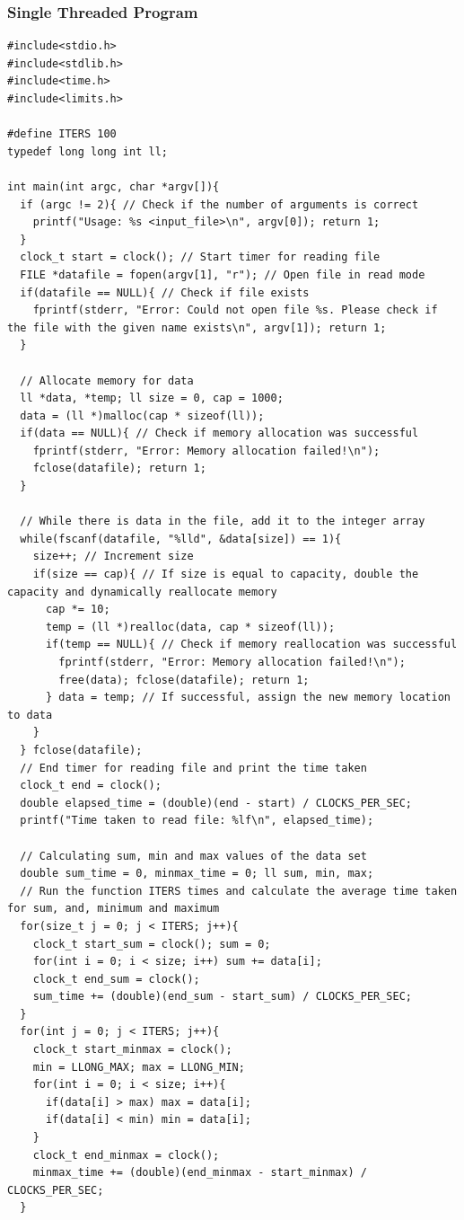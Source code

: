 \documentclass{article}
\theoremstyle{mytheoremstyle}
\theoremstyle{mytheoremstyle}
\theoremstyle{myproblemstyle}
\begin{document}
\subsubsection{Single Threaded Program}
\begin{lstlisting}[caption={Single Threaded Program} label={lst:single}]
#include<stdio.h>
#include<stdlib.h>
#include<time.h>
#include<limits.h>

#define ITERS 100
typedef long long int ll; 

int main(int argc, char *argv[]){
  if (argc != 2){ // Check if the number of arguments is correct
    printf("Usage: %s <input_file>\n", argv[0]); return 1;
  }
  clock_t start = clock(); // Start timer for reading file
  FILE *datafile = fopen(argv[1], "r"); // Open file in read mode
  if(datafile == NULL){ // Check if file exists
    fprintf(stderr, "Error: Could not open file %s. Please check if the file with the given name exists\n", argv[1]); return 1;
  }

  // Allocate memory for data
  ll *data, *temp; ll size = 0, cap = 1000;
  data = (ll *)malloc(cap * sizeof(ll));
  if(data == NULL){ // Check if memory allocation was successful
    fprintf(stderr, "Error: Memory allocation failed!\n");
    fclose(datafile); return 1;
  }

  // While there is data in the file, add it to the integer array
  while(fscanf(datafile, "%lld", &data[size]) == 1){
    size++; // Increment size
    if(size == cap){ // If size is equal to capacity, double the capacity and dynamically reallocate memory
      cap *= 10;
      temp = (ll *)realloc(data, cap * sizeof(ll));
      if(temp == NULL){ // Check if memory reallocation was successful
        fprintf(stderr, "Error: Memory allocation failed!\n");
        free(data); fclose(datafile); return 1;
      } data = temp; // If successful, assign the new memory location to data
    }
  } fclose(datafile); 
  // End timer for reading file and print the time taken
  clock_t end = clock();
  double elapsed_time = (double)(end - start) / CLOCKS_PER_SEC;
  printf("Time taken to read file: %lf\n", elapsed_time);

  // Calculating sum, min and max values of the data set
  double sum_time = 0, minmax_time = 0; ll sum, min, max;
  // Run the function ITERS times and calculate the average time taken for sum, and, minimum and maximum
  for(size_t j = 0; j < ITERS; j++){
    clock_t start_sum = clock(); sum = 0;
    for(int i = 0; i < size; i++) sum += data[i];
    clock_t end_sum = clock();
    sum_time += (double)(end_sum - start_sum) / CLOCKS_PER_SEC;
  }
  for(int j = 0; j < ITERS; j++){
    clock_t start_minmax = clock();
    min = LLONG_MAX; max = LLONG_MIN;
    for(int i = 0; i < size; i++){
      if(data[i] > max) max = data[i];
      if(data[i] < min) min = data[i];
    }
    clock_t end_minmax = clock();
    minmax_time += (double)(end_minmax - start_minmax) / CLOCKS_PER_SEC;
  }


\end{lstlisting}
\end{document}
